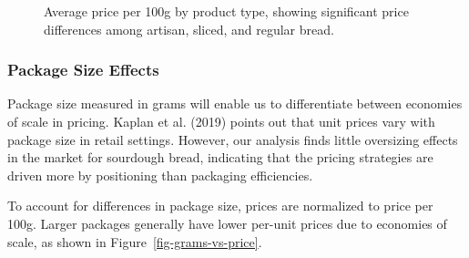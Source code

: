 \documentclass[
  letterpaper,
  DIV=11,
  numbers=noendperiod]{scrartcl}
\begin{document}
\begin{figure}


\caption{\label{fig-product-type-prices}Average price per 100g by
product type, showing significant price differences among artisan,
sliced, and regular bread.}

\end{figure}%

\subsubsection{Package Size Effects}\label{package-size-effects}

Package size measured in grams will enable us to differentiate between
economies of scale in pricing. Kaplan et al. (2019) points out that unit
prices vary with package size in retail settings. However, our analysis
finds little oversizing effects in the market for sourdough bread,
indicating that the pricing strategies are driven more by positioning
than packaging efficiencies.

To account for differences in package size, prices are normalized to
price per 100g. Larger packages generally have lower per-unit prices due
to economies of scale, as shown in Figure~\ref{fig-grams-vs-price}.
\end{document}
